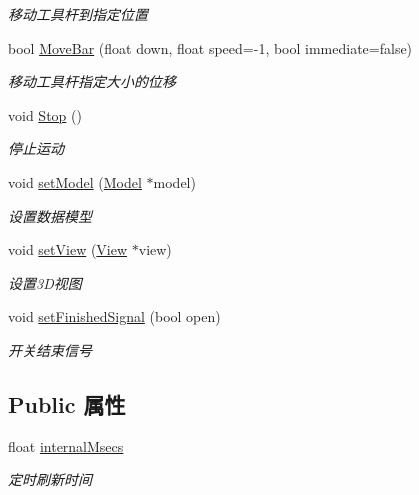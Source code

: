 \begin{DoxyCompactItemize}
\begin{DoxyCompactList}\small\item\em 移动工具杆到指定位置 \end{DoxyCompactList}\item 
bool \hyperlink{class_control_a0e6e5b1243a21767a4707639a6536ef6}{Move\+Bar} (float down, float speed=-\/1, bool immediate=false)
\begin{DoxyCompactList}\small\item\em 移动工具杆指定大小的位移 \end{DoxyCompactList}\item 
\hypertarget{class_control_ad408f3b1eaf5b30c96600f4a299c0119}{}void \hyperlink{class_control_ad408f3b1eaf5b30c96600f4a299c0119}{Stop} ()\label{class_control_ad408f3b1eaf5b30c96600f4a299c0119}

\begin{DoxyCompactList}\small\item\em 停止运动 \end{DoxyCompactList}\item 
void \hyperlink{class_control_ab356fe0c8c30559cbeeb38d4b2c4cc1b}{set\+Model} (\hyperlink{class_model}{Model} $\ast$model)
\begin{DoxyCompactList}\small\item\em 设置数据模型 \end{DoxyCompactList}\item 
void \hyperlink{class_control_a265d02f2f3c4e5bcffab2726ae72b54c}{set\+View} (\hyperlink{class_view}{View} $\ast$view)
\begin{DoxyCompactList}\small\item\em 设置3\+D视图 \end{DoxyCompactList}\item 
void \hyperlink{class_control_adf3a4b133db05f5c0a454fc125ab4d68}{set\+Finished\+Signal} (bool open)
\begin{DoxyCompactList}\small\item\em 开关结束信号 \end{DoxyCompactList}\end{DoxyCompactItemize}
\subsection*{Public 属性}
\begin{DoxyCompactItemize}
\item 
\hypertarget{class_control_a3cfae96ae72da599e682bee89f561527}{}float \hyperlink{class_control_a3cfae96ae72da599e682bee89f561527}{internal\+Msecs}\label{class_control_a3cfae96ae72da599e682bee89f561527}

\begin{DoxyCompactList}\small\item\em 定时刷新时间 \end{DoxyCompactList}\end{DoxyCompactItemize}
